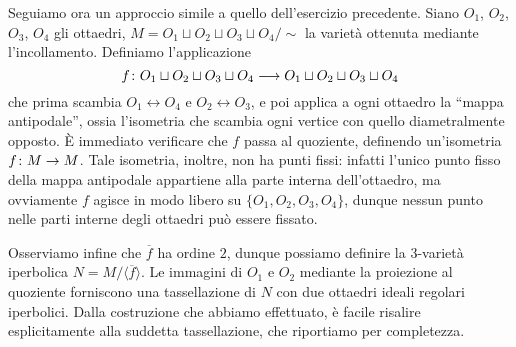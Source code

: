 Seguiamo ora un approccio simile a quello dell'esercizio precedente. Siano $O_1$, $O_2$, $O_3$, $O_4$ gli ottaedri, $M=O_1\sqcup O_2\sqcup O_3\sqcup O_4/\sim$ la varietà ottenuta mediante l'incollamento. Definiamo l'applicazione
\[
\map{f}{O_1\sqcup O_2\sqcup O_3\sqcup O_4}{O_1\sqcup O_2\sqcup O_3\sqcup O_4}
\]
che prima scambia $O_1\leftrightarrow O_4$ e $O_2\leftrightarrow O_3$, e poi applica a ogni ottaedro la ``mappa antipodale'', ossia l'isometria che scambia ogni vertice con quello diametralmente opposto. È immediato verificare che $f$ passa al quoziente, definendo un'isometria $\map{f}{M}{M}$. Tale isometria, inoltre, non ha punti fissi: infatti l'unico punto fisso della mappa antipodale appartiene alla parte interna dell'ottaedro, ma ovviamente $f$ agisce in modo libero su $\{O_1,O_2,O_3,O_4\}$, dunque nessun punto nelle parti interne degli ottaedri può essere fissato.

Osserviamo infine che $\overline{f}$ ha ordine $2$, dunque possiamo definire la $3$-varietà iperbolica $N=M/\langle\overline{f}\rangle$. Le immagini di $O_1$ e $O_2$ mediante la proiezione al quoziente forniscono una tassellazione di $N$ con due ottaedri ideali regolari iperbolici. Dalla costruzione che abbiamo effettuato, è facile risalire esplicitamente alla suddetta tassellazione, che riportiamo per completezza.
